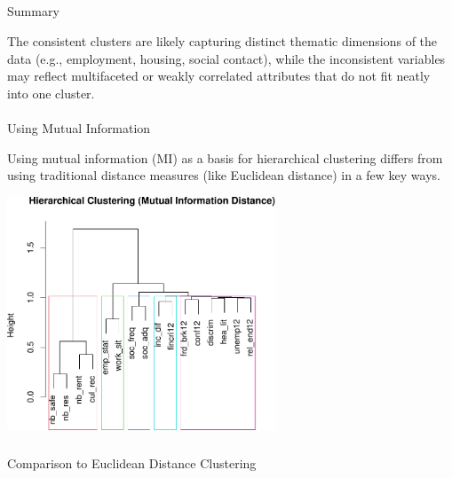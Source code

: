 \documentclass[
]{article}
\makeatletter
\let\oldparagraph\paragraph
\renewcommand{\paragraph}{
    \@ifstar
      \xxxParagraphStar
      \xxxParagraphNoStar
  }
\newcommand{\xxxParagraphStar}[1]{\oldparagraph*{#1}\mbox{}}
\newcommand{\xxxParagraphNoStar}[1]{\oldparagraph{#1}\mbox{}}
\let\oldsubparagraph\subparagraph
\renewcommand{\subparagraph}{
    \@ifstar
      \xxxSubParagraphStar
      \xxxSubParagraphNoStar
  }
\newcommand{\xxxSubParagraphStar}[1]{\oldsubparagraph*{#1}\mbox{}}
\newcommand{\xxxSubParagraphNoStar}[1]{\oldsubparagraph{#1}\mbox{}}
\makeatother
\begin{document}
\subparagraph{Summary}\label{summary-1}

The consistent clusters are likely capturing distinct thematic
dimensions of the data (e.g., employment, housing, social contact),
while the inconsistent variables may reflect multifaceted or weakly
correlated attributes that do not fit neatly into one cluster.

\paragraph{Using Mutual Information}\label{using-mutual-information}

Using mutual information (MI) as a basis for hierarchical clustering
differs from using traditional distance measures (like Euclidean
distance) in a few key ways.

\begin{center}
\includegraphics[width=0.6\textwidth,height=\textheight]{draft_v3_files/figure-pdf/unnamed-chunk-20-1.pdf}
\end{center}

\subparagraph{Comparison to Euclidean Distance
Clustering}\label{comparison-to-euclidean-distance-clustering}
\end{document}
